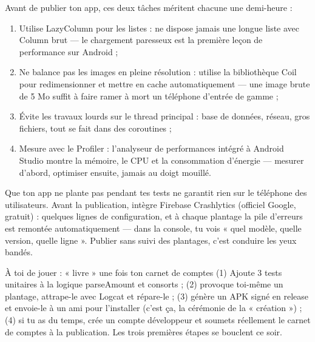 Avant de publier ton app, ces deux tâches méritent chacune une demi-heure :


\begin{enumerate}
  \item Utilise LazyColumn pour les listes : ne dispose jamais une longue liste avec Column brut — le chargement paresseux est la première leçon de performance sur Android ;
  \item Ne balance pas les images en pleine résolution : utilise la bibliothèque Coil pour redimensionner et mettre en cache automatiquement — une image brute de 5 Mo suffit à faire ramer à mort un téléphone d’entrée de gamme ;
  \item Évite les travaux lourds sur le thread principal : base de données, réseau, gros fichiers, tout se fait dans des coroutines ;
  \item Mesure avec le Profiler : l’analyseur de performances intégré à Android Studio montre la mémoire, le CPU et la consommation d’énergie — mesurer d’abord, optimiser ensuite, jamais au doigt mouillé.
\end{enumerate}


Que ton app ne plante pas pendant tes tests ne garantit rien sur le téléphone des utilisateurs. Avant la publication, intègre Firebase Crashlytics (officiel Google, gratuit) : quelques lignes de configuration, et à chaque plantage la pile d’erreurs est remontée automatiquement — dans la console, tu vois « quel modèle, quelle version, quelle ligne ». Publier sans suivi des plantages, c’est conduire les yeux bandés.

\begin{tcbpractice}{À toi de jouer : « livre » une fois ton carnet de comptes}
(1) Ajoute 3 tests unitaires à la logique parseAmount et consorts ; (2) provoque toi-même un plantage, attrape-le avec Logcat et répare-le ; (3) génère un APK signé en release et envoie-le à un ami pour l’installer (c’est ça, la cérémonie de la « création ») ; (4) si tu as du temps, crée un compte développeur et soumets réellement le carnet de comptes à la publication. Les trois premières étapes se bouclent ce soir.

\end{tcbpractice}

